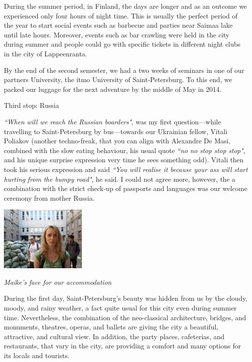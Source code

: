 \documentclass[10pt,a4paper]{article} %
\newcommand{\NewsItem}[1]{ %
\usefont{T1}{fvs}{n}{n} %
\vspace{24pt}\large #1\vspace{3pt} %
\par \normalsize \normalfont}
\begin{document}
\begin{multicols}{3}
During the summer period, in Finland, the days are longer and as an outcome we 
experienced only four hours of night time. 
This is usually the perfect period of the year to start social events such as 
barbecue and parties near Saimaa lake until late hours. 
Moreover, events such as bar crawling were held in the city during summer and people 
could go with specific tickets in different night clubs in the city of Lappeenranta.


By the end of the second semester, we had a two weeks of seminars in one of our 
partners University, the {\sc itmo} University of Saint-Petersburg. 
To this end, we packed our luggage for the next adventure by the middle of May 
in 2014.	

\NewsItem{Third stop: Russia}
%  
\textit{``When will we reach the Russian boarders"}, was my first question---while 
travelling to Saint-Petersburg by bus---towards our Ukrainian fellow, Vitali Poliakov 
(another techno-freak, that you can align with Alexandre De Masi, combined with 
the slow eating behaviour, his usual quote \textit{``no no stop stop stop"}, and  
his unique surprise expression very time he sees something odd). 
Vitali then took his serious expression and said \textit{``You will realise it 
	because your ass will start hurting from the bumpy road"}, he said. 
I could not agree more, however, the a combination with the strict check-up of 
passports and languages was our welcome ceremony from mother Russia.


\begin{center}
	\includegraphics[width=0.32\textwidth]{media/accommodation_in_spb.jpg}
	\par\textit{Maike's face for our accommodation}
\end{center}


During the first day, Saint-Petersburg's beauty was hidden from us by the cloudy, 
moody, and rainy weather, a fact quite usual for this city even during summer time.  
Nevertheless, the combination of the neo-classical architecture, bridges, and 
monuments, theatres, operas, and ballets are giving the city a beautiful, attractive, 
and cultural view. 
In addition, the party places, cafeterias, and restaurants, that vary in the 
city, are providing a comfort and many options for its locals and tourists. 



\end{multicols}
\end{document}

